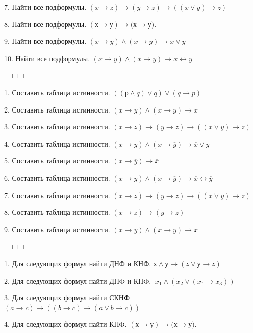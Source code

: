 7. Найти все подформулы. \((x \rightarrow z) \rightarrow (y \rightarrow z) \rightarrow ((x \vee y) \rightarrow z)\)

8. Найти все подформулы. \((х \rightarrow у) \rightarrow (\overline{х} \rightarrow \overline{у)}\).

9. Найти все подформулы. \((x \rightarrow y) \land (x \rightarrow \overline{y}) \rightarrow \overline{x} \vee y\)

10. Найти все подформулы. \((x \rightarrow y) \land (x \rightarrow \overline{y}) \rightarrow \overline{x} \leftrightarrow \overline{y}\)

++++

1. Составить таблица истинности. \(\left( (р \land q) \vee q \right) \vee (q \rightarrow p)\)

2. Составить таблица истинности. \((x \rightarrow y) \land (x \rightarrow \overline{y}) \rightarrow \overline{x}\)

3. Составить таблица истинности. \((x \rightarrow z) \rightarrow (y \rightarrow z) \rightarrow ((x \vee y) \rightarrow z)\)

4. Составить таблица истинности. \((x \rightarrow y) \land (x \rightarrow \overline{y}) \rightarrow \overline{x} \vee y\)

5. Составить таблица истинности. \((x \rightarrow \overline{y}) \rightarrow \overline{x}\)

6. Составить таблица истинности. \((x \rightarrow y) \land (x \rightarrow \overline{y}) \rightarrow \overline{x} \leftrightarrow \overline{y}\)

7. Составить таблица истинности. \((x \rightarrow z) \rightarrow (y \rightarrow z) \rightarrow ((x \vee y) \rightarrow z)\)

8. Составить таблица истинности. \((x \rightarrow z) \rightarrow (y \rightarrow z)\)

9. Составить таблица истинности. \((x \rightarrow y) \land (x \rightarrow \overline{y}) \rightarrow \overline{x}\)

++++

1. Для следующих формул найти ДНФ и КНФ. \(х \land у \rightarrow (z \vee у \rightarrow z)\)

2. Для следующих формул найти ДНФ и КНФ. \(\ x_{1} \land (x_{2} \vee (x_{1} \rightarrow x_{3}))\)

3. Для следующих формул найти СКНФ \(\overline{(a \rightarrow c)} \rightarrow \left( (b \rightarrow c) \rightarrow (a \vee b \rightarrow c) \right)\)

4. Для следующих формул найти КНФ. \((х \rightarrow у) \rightarrow (\overline{х} \rightarrow \overline{у)}\).

